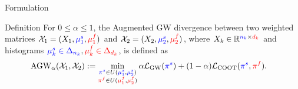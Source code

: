 \documentclass{beamer}
\newcommand{\gw}{\text{GW}}
\newcommand{\coot}{\text{COOT}}
\newcommand{\agw}{\text{AGW}}
\newcommand{\cX}{\mathcal X}
\newcommand{\cL}{\mathcal L}
\newcommand{\bbR}{\mathbb R}
\newcommand{\pis}{{\color{blue}{\pi^s}}}
\newcommand{\pif}{{\color{red}{\pi^f}}}
\newcommand{\mfsrc}{{\color{red}{\mu_1^f}}}
\newcommand{\mftg}{{\color{red}{\mu_2^f}}}
\newcommand{\mssrc}{{\color{blue}{\mu_1^s}}}
\newcommand{\mstg}{{\color{blue}{\mu_2^s}}}
\begin{document}
\begin{frame}{Formulation}
\scriptsize
\begin{block}{Definition}
  For $0\leq \alpha \leq 1$, the Augmented GW divergence between
  two weighted matrices $\cX_1 = (X_1, \mssrc, \mfsrc)$ and
  $\cX_2 = (X_2, \mstg, \mftg)$, where
  $X_k \in \bbR^{{\color{blue}{n_k}} \times {\color{red}{d_k}}}$ and histograms
  ${\color{blue}{\mu^s_k \in \Delta_{n_k}}}, {\color{red}{\mu^f_k \in \Delta_{d_k}}}$,
  is defined as
  \begin{align*}
    \label{eq:scootr}
    \agw_{\alpha}(\cX_1, \cX_2) &:=
    \min_{\substack{\pis \in U(\mssrc,\mstg) \\ \pif \in U(\mfsrc,\mftg)}}
    \alpha \cL_{\gw}(\pis) + (1-\alpha) \cL_{\coot}(\pis, \pif).
  \end{align*}
\end{block}



\end{frame}
\end{document}
